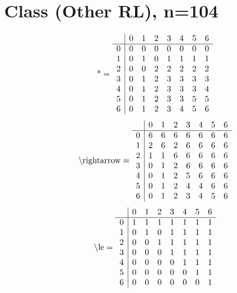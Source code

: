 \documentclass[11pt]{article}
\begin{document}
\section{Class (Other RL), n=104}
\[\text{*} = 
\begin{array}{r | r r r r r r r}
 & 0 & 1 & 2 & 3 & 4 & 5 & 6 \\ \hline
0 & 0 & 0 & 0 & 0 & 0 & 0 & 0 \\
1 & 0 & 1 & 0 & 1 & 1 & 1 & 1 \\
2 & 0 & 0 & 2 & 2 & 2 & 2 & 2 \\
3 & 0 & 1 & 2 & 3 & 3 & 3 & 3 \\
4 & 0 & 1 & 2 & 3 & 3 & 3 & 4 \\
5 & 0 & 1 & 2 & 3 & 3 & 5 & 5 \\
6 & 0 & 1 & 2 & 3 & 4 & 5 & 6 \\
\end{array}
\]
\[\text{\textbackslash rightarrow} = 
\begin{array}{r | r r r r r r r}
 & 0 & 1 & 2 & 3 & 4 & 5 & 6 \\ \hline
0 & 6 & 6 & 6 & 6 & 6 & 6 & 6 \\
1 & 2 & 6 & 2 & 6 & 6 & 6 & 6 \\
2 & 1 & 1 & 6 & 6 & 6 & 6 & 6 \\
3 & 0 & 1 & 2 & 6 & 6 & 6 & 6 \\
4 & 0 & 1 & 2 & 5 & 6 & 6 & 6 \\
5 & 0 & 1 & 2 & 4 & 4 & 6 & 6 \\
6 & 0 & 1 & 2 & 3 & 4 & 5 & 6 \\
\end{array}
\]
\[\text{\textbackslash le} = 
\begin{array}{r | r r r r r r r}
 & 0 & 1 & 2 & 3 & 4 & 5 & 6 \\ \hline
0 & 1 & 1 & 1 & 1 & 1 & 1 & 1 \\
1 & 0 & 1 & 0 & 1 & 1 & 1 & 1 \\
2 & 0 & 0 & 1 & 1 & 1 & 1 & 1 \\
3 & 0 & 0 & 0 & 1 & 1 & 1 & 1 \\
4 & 0 & 0 & 0 & 0 & 1 & 1 & 1 \\
5 & 0 & 0 & 0 & 0 & 0 & 1 & 1 \\
6 & 0 & 0 & 0 & 0 & 0 & 0 & 1 \\
\end{array}
\]
\end{document}
